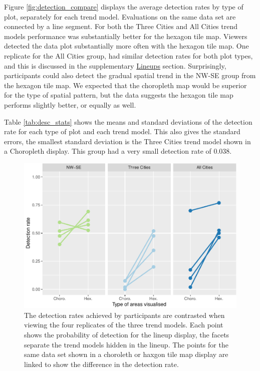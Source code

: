 \documentclass[conference,final,]{IEEEtran}
\makeatletter
\def\maxwidth{\ifdim\Gin@nat@width>\linewidth\linewidth
\else\Gin@nat@width\fi}
\let\Oldincludegraphics\includegraphics
\renewcommand{\includegraphics}[1]{\Oldincludegraphics[width=\maxwidth]{#1}}
\makeatother
\begin{document}
Figure \ref{fig:detection_compare} displays the average detection rates
by type of plot, separately for each trend model. Evaluations on the
same data set are connected by a line segment. For both the Three Cities
and All Cities trend models performance was substantially better for the
hexagon tile map. Viewers detected the data plot substantially more
often with the hexagon tile map. One replicate for the All Cities group,
had similar detection rates for both plot types, and this is discussed
in the supplementary \protect\hyperlink{lineups}{Lineups} section.
Surprisingly, participants could also detect the gradual spatial trend
in the NW-SE group from the hexagon tile map. We expected that the
choropleth map would be superior for the type of spatial pattern, but
the data suggests the hexagon tile map performs slightly better, or
equally as well.

Table \ref{tab:desc_stats} shows the means and standard deviations of
the detection rate for each type of plot and each trend model. This also
gives the standard errors, the smallest standard deviation is the Three
Cities trend model shown in a Choropleth display. This group had a very
small detection rate of 0.038.

\begin{figure}
\centering
\includegraphics{paper_files/figure-latex/detection_compare-1.pdf}
\caption{The detection rates achieved by participants are contrasted
when viewing the four replicates of the three trend models. Each point
shows the probability of detection for the lineup display, the facets
separate the trend models hidden in the lineup. The points for the same
data set shown in a choroleth or haxgon tile map display are linked to
show the difference in the detection rate.}
\end{figure}
\end{document}
